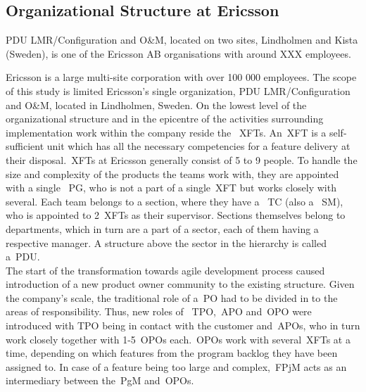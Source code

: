\begin{comment}

# Prehistory
- Matrix organisation
- 

# Reasoning
- Enhance productivity
- Mention trade-off and interrelation between planning and and short-term view in agile
- 

# Expectations
- 

# Current challenges
- Information sink (responsibility pressed downwards into ~\ac{XFT}s)
- Shared understanding and communication between teams
- Understanding the overall vision and direction
- Integrating works and making process, technical foundation improvements available to all
- 

\end{comment}

\subsection{Organizational Structure at Ericsson}
\label{Chap:OrgStrucEricsson}

PDU LMR/Configuration and O\&M, located on two sites, Lindholmen and Kista (Sweden), is one of the Ericsson AB organisations with around XXX employees. 

Ericsson is a large multi-site corporation with over 100 000 employees. The scope of this study is limited  Ericsson's single organization, PDU LMR/Configuration and O\&M, located in Lindholmen, Sweden.
On the lowest level of the organizational structure and in the epicentre of the activities surrounding implementation work within the company reside the ~\ac{XFT}s. An~\ac{XFT} is a self-sufficient unit which has all the necessary competencies for a feature delivery at their disposal.~\ac{XFT}s at Ericsson generally consist of 5 to 9 people. To handle the size and complexity of the products the teams work with, they are appointed with a single ~\ac{PG}, who is not a part of a single~\ac{XFT} but works closely with several. Each team belongs to a section, where they have a ~\ac{TC} (also a ~\ac{SM}), who is appointed to 2~\ac{XFT}s as their supervisor. Sections themselves belong to departments, which in turn are a part of a sector, each of them having a respective manager. A structure above the sector in the hierarchy is called a~\ac{PDU}.\\
The start of the transformation towards agile development process caused introduction of a new product owner community to the existing structure. Given the company's scale, the traditional role of a~\ac{PO} had to be divided in to the areas of responsibility. Thus, new roles of ~\ac{TPO},~\ac{APO} and~\ac{OPO} were introduced with TPO being in contact with the customer and~\ac{APO}s, who in turn work closely together with 1-5~\ac{OPO}s each.~\ac{OPO}s work with several~\ac{XFT}s at a time, depending on which features from the program backlog they have been assigned to. In case of a feature being too large and complex,~\ac{FPjM} acts as an intermediary between the~\ac{PgM} and~\ac{OPO}s.

